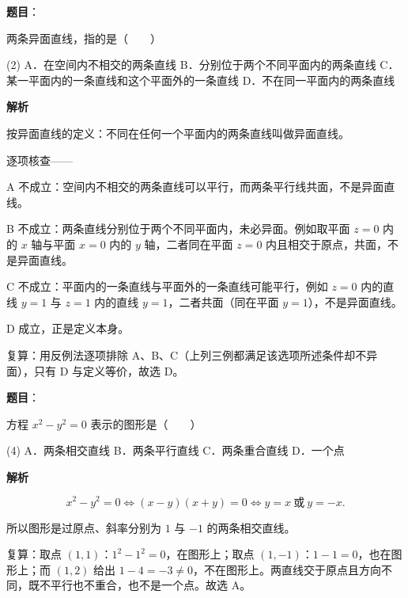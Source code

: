 \begin{answer}

\textbf{题目}：

两条异面直线，指的是\mbox{（　　）}

\begin{gkopts}(2)
\task A．在空间内不相交的两条直线
\task B．分别位于两个不同平面内的两条直线
\task C．某一平面内的一条直线和这个平面外的一条直线
\task D．不在同一平面内的两条直线
\end{gkopts}

\textbf{解析}

按异面直线的定义：不同在任何一个平面内的两条直线叫做异面直线。

逐项核查——

A 不成立：空间内不相交的两条直线可以平行，而两条平行线共面，不是异面直线。

B 不成立：两条直线分别位于两个不同平面内，未必异面。例如取平面 $z=0$ 内的 $x$ 轴与平面 $x=0$ 内的 $y$ 轴，二者同在平面 $z=0$ 内且相交于原点，共面，不是异面直线。

C 不成立：平面内的一条直线与平面外的一条直线可能平行，例如 $z=0$ 内的直线 $y=1$ 与 $z=1$ 内的直线 $y=1$，二者共面（同在平面 $y=1$），不是异面直线。

D 成立，正是定义本身。

复算：用反例法逐项排除 A、B、C（上列三例都满足该选项所述条件却不异面），只有 D 与定义等价，故选 D。


\end{answer}
\begin{answer}

\textbf{题目}：

方程 $x^2-y^2=0$ 表示的图形是\mbox{（　　）}

\begin{gkopts}(4)
\task A．两条相交直线
\task B．两条平行直线
\task C．两条重合直线
\task D．一个点
\end{gkopts}

\textbf{解析}

\nopagebreak[4]
\[
x^2-y^2=0\iff(x-y)(x+y)=0\iff y=x\ \text{或}\ y=-x.
\]

所以图形是过原点、斜率分别为 $1$ 与 $-1$ 的两条相交直线。

复算：取点 $(1,1)$：$1^2-1^2=0$，在图形上；取点 $(1,-1)$：$1-1=0$，也在图形上；而 $(1,2)$ 给出 $1-4=-3\neq0$，不在图形上。两直线交于原点且方向不同，既不平行也不重合，也不是一个点。故选 A。


\end{answer}
